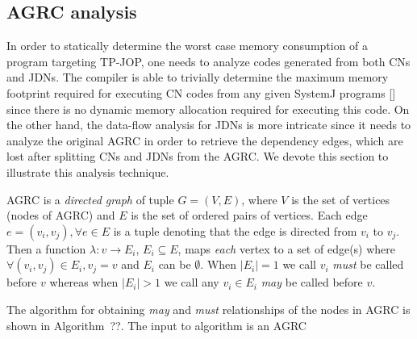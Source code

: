 
\subsection{AGRC analysis}
\label{sec:agrc-analysis}

In order to statically determine the worst case memory consumption of a
program targeting TP-JOP, one needs to analyze codes generated from both
CNs and JDNs. The compiler is able to trivially determine the maximum
memory footprint required for executing CN codes from any given SystemJ
programs [] since there is no dynamic memory allocation required for
executing this code. On the other hand, the data-flow analysis for JDNs
is more intricate since it needs to analyze the original AGRC in order
to retrieve the dependency edges, which are lost after splitting CNs and
JDNs from the AGRC. We devote this section to illustrate this analysis
technique.

AGRC is a \textit{directed graph} of tuple $G =(V,E)$, where $V$ is the
set of vertices (nodes of AGRC) and $E$ is the set of ordered pairs of
vertices. Each edge $e = (v_i,v_j), \forall e \in E$ is a tuple denoting
that the edge is directed from $v_i$ to $v_j$. Then a function
$\lambda:v \rightarrow E_i$, $E_i \subseteq E$, maps \textit{each}
vertex to a set of edge(s) where $\forall (v_i,v_j) \in E_i, v_j = v$
and $E_i$ can be $\emptyset$. When $|E_i| = 1$ we call $v_i$
\textit{must} be called before $v$ whereas when $|E_i| > 1$ we call any
$v_i \in E_i$ \textit{may} be called before $v$.

The algorithm for obtaining \textit{may} and \textit{must} relationships
of the nodes in AGRC is shown in Algorithm~??. The input to algorithm is
an AGRC  

